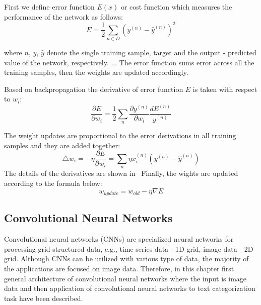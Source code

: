 First we define error function $E(x)$ or cost function which measures the performance of the network as follows:%
\begin{equation}
    E= \frac{1}{2}\sum_{n\in D} (y^{(n)}-\hat{y}^{(n)})^2
\end{equation}


where $n$, $y$, $\hat{y}$ denote the single training sample, target and the output - predicted value of the network, respectively. ... The error function sums error across all the training samples, then the weights are updated accordingly. 

Based on backpropagation the derivative of error function $E$ is taken with respect to $w_i$:
\begin{equation}
    \frac{\partial E}{\partial w_i}=\frac{1}{2}\sum_{n} \frac{\partial y^{(n)}}{\partial w_i} \frac{dE^{(n)}}{y^{(n)}}
\end{equation}

The weight updates are proportional to the error derivations in all training samples and they are added together:
\begin{equation}
    \triangle w_i = - \eta \frac{\partial E}{\partial w_i} = \sum_{n} \eta x_i^{(n)} (y^{(n)} - \hat{y}^{(n)})
\end{equation}
The details of the derivatives are shown in~\cite{}
Finally, the wights are updated according to the formula below:
\begin{equation}
   w_{update}= w_{old}-\eta \nabla E
\end{equation}
    
\subsection{Convolutional Neural Networks}
Convolutional neural networks (CNNs) are specialized neural networks for processing grid-structured data, e.g., time series data - 1D grid, image data - 2D grid. Although CNNs can be utilized with various type of data, the majority of the applications are focused on image data. Therefore, in this chapter first general architecture of convolutional neural networks where the input is image data and then application of convolutional neural networks to text categorization task have been described. 

